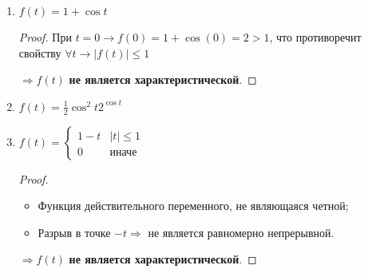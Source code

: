 \documentclass[a4paper,12pt]{article}
\newcommand{\fr}{\frac}
\begin{document}
\begin{enumerate}
\item $f(t) = 1+\cos t$
\begin{proof}
При $t = 0 \rightarrow f(0) = 1 + \cos(0) = 2 >1$, что противоречит свойству $\forall t\rightarrow |f(t)|\le 1$

$\Rightarrow f(t)$ \textbf{не является характеристической}. 
\end{proof}	

\item $f(t) = \fr{1}{2}\cos^2t2^{\cos t}$

\item $f(t) = 
\begin{cases}
1 - t& |t| \le 1\\
0& \text{иначе}
\end{cases}$
\begin{proof}

\begin{itemize}
	\item Функция действительного переменного, не являющаяся четной;
	\item Разрыв в точке $-t \Rightarrow$ не является равномерно непрерывной.
\end{itemize}

$\Rightarrow f(t)$ \textbf{не является характеристической}.

\end{proof}

\end{enumerate}
\end{document}
